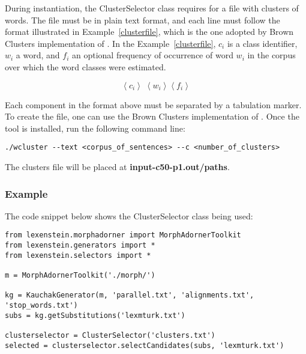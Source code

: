 During instantiation, the ClusterSelector class requires for a file with clusters of words. The file must be in plain text format, and each line must follow the format illustrated in Example~\ref{clusterfile}, which is the one adopted by Brown Clusters \cite{brownclusters} implementation of \cite{brownsoftware}. In the Example~\ref{clusterfile}, $c_{i}$ is a class identifier, $w_{i}$ a word, and $f_{i}$ an optional frequency of occurrence of word $w_{i}$ in the corpus over which the word classes were estimated.

\begin{equation}
\label{clusterfile}
\left\langle c_{i} \right\rangle\; \left\langle w_{i} \right\rangle \left\langle f_{i} \right\rangle
\end{equation}

Each component in the format above must be separated by a tabulation marker. To create the file, one can use the Brown Clusters implementation of \cite{brownsoftware}. Once the tool is installed, run the following command line:

\begin{lstlisting}
./wcluster --text <corpus_of_sentences> --c <number_of_clusters>
\end{lstlisting}

The clusters file will be placed at \textbf{input-c50-p1.out/paths}.

\subsubsection{Example}

The code snippet below shows the ClusterSelector class being used:

\begin{lstlisting}
from lexenstein.morphadorner import MorphAdornerToolkit
from lexenstein.generators import *
from lexenstein.selectors import *

m = MorphAdornerToolkit('./morph/')

kg = KauchakGenerator(m, 'parallel.txt', 'alignments.txt', 'stop_words.txt')
subs = kg.getSubstitutions('lexmturk.txt')

clusterselector = ClusterSelector('clusters.txt')
selected = clusterselector.selectCandidates(subs, 'lexmturk.txt')
\end{lstlisting}










